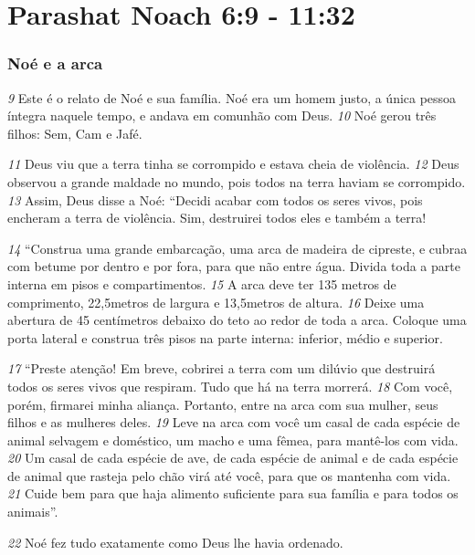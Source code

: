 \section*{Parashat Noach 6:9 - 11:32}
\subsubsection*{Noé e a arca}

\bigskip
\textit{\tiny 9}
 Este é o relato de Noé e sua família. Noé era um homem justo, a única pessoa íntegra naquele tempo, e andava em comunhão com Deus. 
\textit{\tiny 10}
Noé gerou três filhos: Sem, Cam e Jafé.



\bigskip
\textit{\tiny 11}
 Deus viu que a terra tinha se corrompido e estava cheia de violência. 
\textit{\tiny 12}
 Deus observou a grande maldade no mundo, pois todos na terra haviam se corrompido. 
\textit{\tiny 13}
 Assim, Deus disse a Noé: “Decidi acabar com todos os seres vivos, pois encheram a terra de violência. Sim, destruirei todos eles e também a terra!



\bigskip
\textit{\tiny 14}
 “Construa uma grande embarcação, uma arca de madeira de cipreste, e cubraa com betume por dentro e por fora, para que não entre água. Divida toda a parte interna em pisos e compartimentos. 
\textit{\tiny 15}
 A arca deve ter 135 metros de comprimento, 
22,5metros de largura e 
13,5metros de altura. 
\textit{\tiny 16}
 Deixe uma abertura de 45 centímetros debaixo do teto ao redor de toda a arca. Coloque uma porta lateral e construa três pisos na parte interna: inferior, médio e superior.



\bigskip
\textit{\tiny 17}
 “Preste atenção! Em breve, cobrirei a terra com um dilúvio que destruirá todos os seres vivos que respiram. Tudo que há na terra morrerá. 
\textit{\tiny 18}
 Com você, porém, firmarei minha aliança. Portanto, entre na arca com sua mulher, seus filhos e as mulheres deles. 
\textit{\tiny 19}
 Leve na arca com você um casal de cada espécie de animal selvagem e doméstico, um macho e uma fêmea, para mantê-los com vida. 
\textit{\tiny 20}
 Um casal de cada espécie de ave, de cada espécie de animal e de cada espécie de animal que rasteja pelo chão virá até você, para que os mantenha com vida. 
\textit{\tiny 21}
 Cuide bem para que haja alimento suficiente para sua família e para todos os animais”.



\bigskip
\textit{\tiny 22}
 Noé fez tudo exatamente como Deus lhe havia ordenado.

